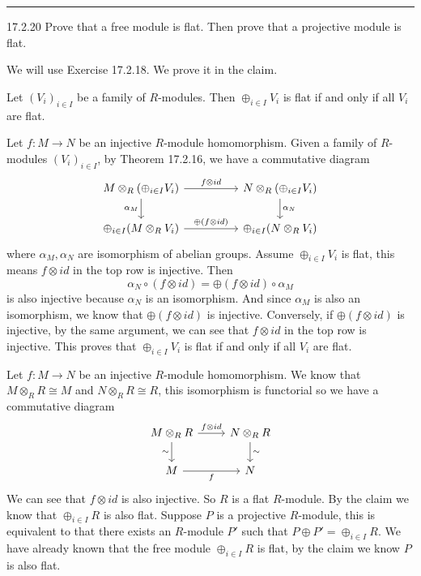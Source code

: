 \documentclass[a4paper, 12pt]{article}
\begin{document}
\noindent\rule{7in}{2.8pt}
\begin{problem}{17.2.20}
Prove that a free module is flat. Then prove that a projective module is flat. 
\end{problem}
\begin{solution}
We will use Exercise 17.2.18. We prove it in the claim.
\begin{claim}
Let \((V_i)_{i\in I}\) be a family of \(R\)-modules. Then \(\oplus_{i\in I}V_i\) is flat if and only if all \(V_i\) are flat. 
\end{claim}
\begin{claimproof}
Let \(f:M\rightarrow N\) be an injective \(R\)-module homomorphism. Given a family of \(R\)-modules \((V_i)_{i\in I}\), by Theorem 17.2.16, we have a commutative diagram 
\[\begin{tikzcd}
	{M\otimes_R(\oplus_{i\in I}V_i)} && {N\otimes_R(\oplus_{i\in I}V_i)} \\
	{\oplus_{i\in I}(M\otimes_RV_i)} && {\oplus_{i\in I}(N\otimes_RV_i)}
	\arrow["{f\otimes id}", from=1-1, to=1-3]
	\arrow["{\alpha_M}"', from=1-1, to=2-1]
	\arrow["{\alpha_N}", from=1-3, to=2-3]
	\arrow["{\oplus(f\otimes id)}", from=2-1, to=2-3]
\end{tikzcd}\]
where \(\alpha_M,\alpha_N\) are isomorphism of abelian groups. Assume \(\oplus_{i\in I}V_i\) is flat, this means \(f\otimes id\) in the top row is injective. Then 
\[\alpha_N\circ (f\otimes id)=\oplus(f\otimes id)\circ \alpha_M\]
is also injective because \(\alpha_N\) is an isomorphism. And since \(\alpha_M\) is also an isomorphism, we know that \(\oplus(f\otimes id)\) is injective. Conversely, if \(\oplus(f\otimes id)\) is injective, by the same 
argument, we can see that \(f\otimes id\) in the top row is injective. This proves that \(\oplus_{i\in I}V_i\) is flat if and only if all \(V_i\) are flat.
\end{claimproof}

Let \(f:M\rightarrow N\) be an injective \(R\)-module homomorphism. We know that \(M\otimes_R R\cong M\) and \(N\otimes_R R\cong R\), this isomorphism is functorial so we have a commutative diagram 
\[\begin{tikzcd}
	{M\otimes_R R} & {N\otimes_R R} \\
	M & N
	\arrow["{f\otimes id }", from=1-1, to=1-2]
	\arrow["\sim"', from=1-1, to=2-1]
	\arrow["\sim", from=1-2, to=2-2]
	\arrow["f"', from=2-1, to=2-2]
\end{tikzcd}\]
We can see that \(f\otimes id\) is also injective. So \(R\) is a flat \(R\)-module. By the claim we know that \(\oplus_{i\in I}R\) is also flat. Suppose \(P\) is a projective \(R\)-module, this is equivalent to that there exists 
an \(R\)-module \(P'\) such that \(P\oplus P'=\oplus_{i\in I}R\). We have already known that the free module \(\oplus_{i\in I}R\) is flat, by the claim we know \(P\) is also flat. 

\end{solution}
\end{document}
